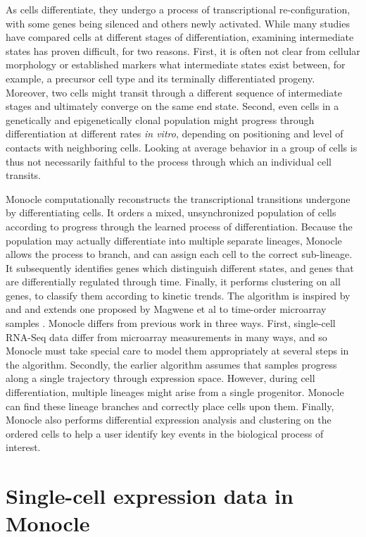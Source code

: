 \documentclass[10pt,oneside]{article}\usepackage[]{graphicx}\usepackage[]{color}
\begin{document}
As cells differentiate, they undergo a process of transcriptional re-configuration, with some genes being silenced and others newly activated. While many studies have compared cells at different stages of differentiation, examining intermediate states has proven difficult, for two reasons.  First, it is often not clear from cellular morphology or established markers what intermediate states exist between, for example, a precursor cell type and its terminally differentiated progeny.  Moreover, two cells might transit through a different sequence of intermediate stages and ultimately converge on the same end state.  Second, even cells in a genetically and epigenetically clonal population might progress through differentiation at different rates \emph{in vitro}, depending on positioning and level of contacts with neighboring cells. Looking at average behavior in a group of cells is thus not necessarily faithful to the process through which an individual cell transits.

Monocle computationally reconstructs the transcriptional transitions undergone by differentiating cells.  It orders a mixed, unsynchronized population of cells according to progress through the learned process of differentiation. Because the population may actually differentiate into multiple separate lineages, Monocle allows the process to branch, and can assign each cell to the correct sub-lineage. It subsequently identifies genes which distinguish different states, and genes that are differentially regulated through time. Finally, it performs clustering on all genes, to classify them according to kinetic trends. The algorithm is inspired by and and extends one proposed by Magwene et al to time-order microarray samples \cite{Magwene:2003kq}. Monocle differs from previous work in three ways. First, single-cell RNA-Seq data differ from microarray measurements in many ways, and so Monocle must take special care to model them appropriately at several steps in the algorithm. Secondly, the earlier algorithm assumes that samples progress along a single trajectory through expression space.  However, during cell differentiation, multiple lineages might arise from a single progenitor.  Monocle can find these lineage branches and correctly place cells upon them. Finally, Monocle also performs differential expression analysis and clustering on the ordered cells to help a user identify key events in the biological process of interest.

\section{Single-cell expression data in Monocle}
\end{document}
